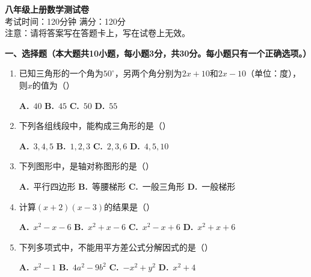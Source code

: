 \documentclass[12pt, a4paper]{ctexart}
\begin{document}
\begin{center}
    {\LARGE\bfseries 八年级上册数学测试卷}\\[0.5cm]
    {\large 考试时间：120分钟 \quad 满分：120分}\\[0.3cm]
    {\normalsize 注意：请将答案写在答题卡上，写在试卷上无效。}
\end{center}

\vspace{0.5cm}

{\large\bfseries 一、选择题（本大题共10小题，每小题3分，共30分。每小题只有一个正确选项。）}

\begin{enumerate}[label=\arabic*.]

\item 已知三角形的一个角为$50^{\circ}$，另两个角分别为$2x+10$和$2x-10$（单位：度），则$x$的值为（\hspace{1cm}）
\begin{enumerate}[label=\Alph*.]
\quad \textbf{A.}~$40$ \quad \textbf{B.}~$45$ \quad \textbf{C.}~$50$ \quad \textbf{D.}~$55$
\end{enumerate}

\item 下列各组线段中，能构成三角形的是（\hspace{1cm}）
\begin{enumerate}[label=\Alph*.]
\quad \textbf{A.}~$3,4,5$ \quad \textbf{B.}~$1,2,3$ \quad \textbf{C.}~$2,3,6$ \quad \textbf{D.}~$4,5,10$
\end{enumerate}

\item 下列图形中，是轴对称图形的是（\hspace{1cm}）
\begin{enumerate}[label=\Alph*.]
\quad \textbf{A.}~平行四边形 \quad \textbf{B.}~等腰梯形 \quad \textbf{C.}~一般三角形 \quad \textbf{D.}~一般梯形
\end{enumerate}

\item 计算$(x+2)(x-3)$的结果是（\hspace{1cm}）
\begin{enumerate}[label=\Alph*.]
\quad \textbf{A.}~$x^{2}-x-6$ \quad \textbf{B.}~$x^{2}+x-6$ \quad \textbf{C.}~$x^{2}-x+6$ \quad \textbf{D.}~$x^{2}+x+6$
\end{enumerate}

\item 下列多项式中，不能用平方差公式分解因式的是（\hspace{1cm}）
\begin{enumerate}[label=\Alph*.]
\quad \textbf{A.}~$x^{2}-1$ \quad \textbf{B.}~$4a^{2}-9b^{2}$ \quad \textbf{C.}~$-x^{2}+y^{2}$ \quad \textbf{D.}~$x^{2}+4$
\end{enumerate}


\end{enumerate}
\end{document}
